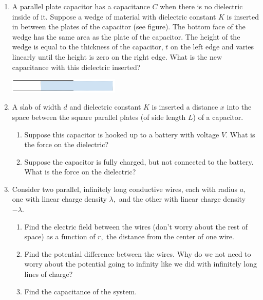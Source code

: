 \documentclass[12pt]{book}
\begin{document}
\begin{enumerate}
 
 \item A parallel plate capacitor has a capacitance $C$ when there is no dielectric inside of it. Suppose a wedge of material with dielectric constant $K$ is inserted in between the plates of the capacitor (see figure). The bottom face of the wedge has the same area as the plate of the capacitor. The height of the wedge is equal to the thickness of the capacitor, $t$ on the left edge and varies linearly until the height is zero on the right edge. What is the new capacitance with this dielectric inserted?
 
 \begin{center}
  \includegraphics[width=200px]{CapProb.png}
 \end{center}

 
 \item A slab of width $d$ and dielectric constant $K$ is inserted a distance $x$ into the space between the square parallel plates (of side length $L$) of a capacitor. 
 
 \begin{enumerate}
  \item Suppose this capacitor is hooked up to a battery with voltage $V.$ What is the force on the dielectric?
  \item Suppose the capacitor is fully charged, but not connected to the battery. What is the force on the dielectric?
 \end{enumerate}
 
 \item  Consider two parallel, infinitely long conductive wires, each with radius $a,$ one with linear charge density $\lambda,$ and the other with linear charge density $-\lambda.$
 
 \begin{enumerate}
 \item  Find the electric field between the wires (don't worry about the rest of space) as a function of $r,$ the distance from the center of one wire.
 \item  Find the potential difference between the wires. Why do we not need to worry about the
potential going to infinity like we did with infinitely long lines of charge?
\item Find the capacitance of the system.
 \end{enumerate}
 
 \end{enumerate}
\end{document}
